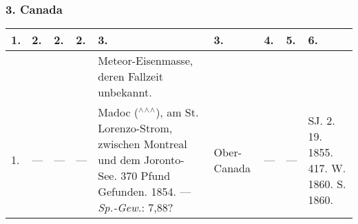 \documentclass[a4paper, 8pt, oneside, polutonikogreek, german]{article}
\begin{document}
\subsubsection{3. Canada}
\begin{table}[H]
    \centering
    \footnotesize
    \begin{longtable}{|p{3mm}|p{4mm}|p{11mm}|p{7mm}|p{22mm}|p{14mm}|p{10mm}|p{10mm}|p{13mm}|}
    \hline
        1. & 2. & 2. & 2. & 3. & 3. & 4. & 5. & 6. \\ \hline
          &   &   &   & Meteor-Eisenmasse, deren Fallzeit unbekannt. &   &   &   &   \\ \hline
        1. & --- & --- & --- & Madoc ($^\wedge$$^\wedge$$^\wedge$), am St. Lorenzo-Strom, zwischen Montreal und dem Joronto-See. 370 Pfund Gefunden. 1854. --- \emph{Sp.-Gew.}: 7,88? & Ober-Canada & --- & --- & SJ. 2. 19. 1855. 417. W. 1860. S. 1860. \\ \hline
    \end{longtable}
\end{table}
\end{document}
